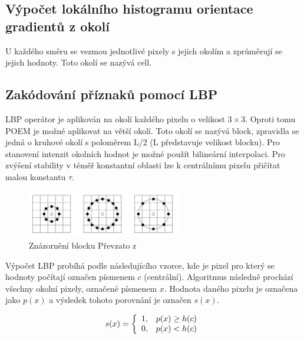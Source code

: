 \documentclass[czech,BP]{thesiskiv}
\begin{document}
\subsection{Výpočet lokálního histogramu orientace gradientů z okolí}
U každého směru  se vezmou jednotlivé pixely s jejich okolím a zprůměrují se jejich hodnoty. Toto okolí se nazývá cell. \\

\subsection{Zakódování příznaků pomocí LBP}
\par LBP operátor je aplikován na okolí každého pixelu o velikost $3 \times 3$. Oproti tomu POEM je možné aplikovat na větší okolí. Toto okolí se nazývá block, zpravidla se jedná o kruhové okolí s poloměrem L/2 (L představuje velikost blocku). Pro stanovení intenzit okolních hodnot je možné použít bilineární interpolaci. Pro zvýšení stability v téměř konstantní oblasti lze k centrálnímu pixelu přičítat malou konstantu $\tau$. 

\begin{figure}[H]
		\centering
		\includegraphics[width=253px]{./img/znazorneni_lbp.png}	
		\caption{Znázornění blocku Převzato z \cite{SrovnaniDeskriptoru}}
\end{figure}

\par Výpočet LBP probíhá podle následujícího vzorce, kde je pixel pro který se hodnoty počítají označen písmenem $c$ (centrální). Algoritmus následně prochází všechny okolní pixely, označené písmenem  $x$. Hodnota daného pixelu je označena jako $p(x)$ a výsledek tohoto porovnání je označen $s(x)$.

\begin{displaymath} 
	\label{asd2} 
		    s(x) = \left\{ \begin{array}{r@{\quad}c}
    		1, & p(x) \geq h(c) \\
    		0, & p(x) < h(c) \\ \end{array} \right. 
\end{displaymath}
\end{document}
